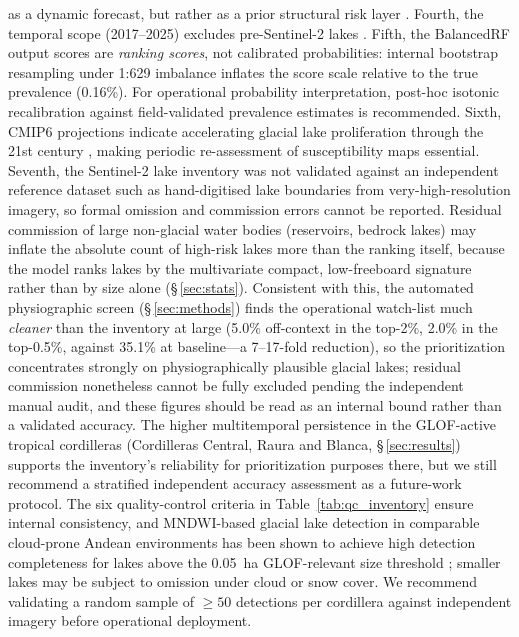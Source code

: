 \documentclass[pdflatex,sn-basic]{sn-jnl}%
\begin{document}
as a dynamic forecast, but rather as a prior structural risk layer
\citep{Reichenbach2018}. Fourth, the temporal scope (2017--2025)
excludes pre-Sentinel-2 lakes \citep{Veh2022}. Fifth, the BalancedRF
output scores are \textit{ranking scores}, not calibrated
probabilities: internal bootstrap resampling under 1:629 imbalance
inflates the score scale relative to the true prevalence (0.16\%).
For operational probability interpretation, post-hoc isotonic
recalibration against field-validated prevalence estimates is
recommended. Sixth, CMIP6 projections indicate accelerating glacial
lake proliferation through the 21st century
\citep{Zekollari2024,Hock2019,Rounce2023,Furian2022}, making periodic re-assessment of
susceptibility maps essential. Seventh, the Sentinel-2 lake inventory
was not validated against an independent reference dataset such as
hand-digitised lake boundaries from very-high-resolution imagery, so
formal omission and commission errors cannot be reported. Residual
commission of large non-glacial water bodies (reservoirs, bedrock lakes)
may inflate the absolute count of high-risk lakes more than the ranking
itself, because the model ranks lakes by the multivariate compact,
low-freeboard signature rather than by size alone (\S\,\ref{sec:stats}).
Consistent with this, the automated physiographic screen
(\S\,\ref{sec:methods}) finds the operational watch-list much
\emph{cleaner} than the inventory at large (5.0\% off-context in the
top-2\%, 2.0\% in the top-0.5\%, against 35.1\% at baseline---a 7--17-fold
reduction), so the prioritization concentrates strongly on physiographically
plausible glacial lakes; residual
commission nonetheless cannot be fully excluded pending the independent
manual audit, and these figures should be read as an internal bound rather
than a validated accuracy. The higher
multitemporal persistence in the GLOF-active tropical cordilleras
(Cordilleras Central, Raura and Blanca, \S\,\ref{sec:results})
supports the inventory's reliability for prioritization purposes there, but
we still recommend a stratified independent accuracy assessment as a
future-work protocol.
The six quality-control criteria in Table~\ref{tab:qc_inventory}
ensure internal consistency, and MNDWI-based glacial lake detection in
comparable cloud-prone Andean environments has been shown to achieve
high detection completeness for lakes above the 0.05~ha GLOF-relevant
size threshold \citep{Wangchuk2020,Shugar2020}; smaller lakes may be
subject to omission under cloud or snow cover. We recommend validating
a random sample of $\geq\!50$ detections per cordillera against
independent imagery before operational deployment.
\end{document}
